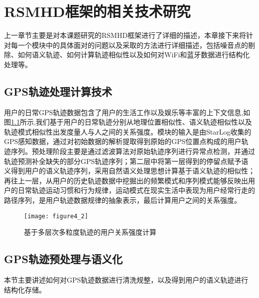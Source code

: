 \chapter{RSMHD框架的相关技术研究}
\label{chap:chapter03}
上一章节主要是对本课题研究的RSMHD框架进行了详细的描述，本章接下来将针对每一个模块中的具体面对的问题以及采取的方法进行详细描述，包括噪音点的剔除、如何语义轨迹、如何计算轨迹相似性以及如何对WiFi和蓝牙数据进行结构化处理等。
\section{GPS轨迹处理计算技术}
\label{sec:section3-1}
用户的日常GPS轨迹数据包含了用户的生活工作以及娱乐等丰富的上下文信息,如图\ref{fig:tramodel}所示,我们基于用户的日常轨迹分别从地理位置相似性、语义轨迹相似性以及轨迹模式相似性出发度量人与人之间的关系强度。模块的输入是由StarLog收集的GPS感知数据，通过对初始数据的解析提取得到原始的GPS位置点构成的用户轨迹序列。预处理阶段主要是通过滤波算法对原始轨迹序列进行异常点检测，并通过轨迹预测补全缺失的部分GPS轨迹序列；第二层中将第一层得到的停留点赋予语义得到用户的语义轨迹序列，采用自然语义处理思想计算基于语义轨迹的相似性；再往上一层，从用户的历史轨迹数据中挖掘出的频繁模式和序列模式能够反映出用户的日常轨迹运动习惯和行为规律，运动模式在现实生活中表现为用户经常行走的路径序列，是用户轨迹数据规律的抽象表示，最后计算用户之间的关系强度。
\begin{figure}[htp]
\centering
\texttt{[image: figure4\_2]}
\caption{基于多层次多粒度轨迹的用户关系强度计算}
\label{fig:tramodel}
\end{figure}
\section{GPS轨迹预处理与语义化}
\label{sec:section3-2}
本节主要讲述如何对GPS轨迹数据进行清洗规整，以及得到用户的语义轨迹进行结构化存储。
